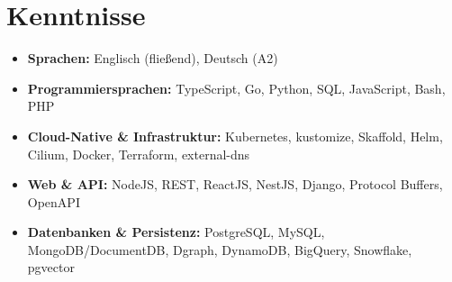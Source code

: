 \documentclass[11pt,a4paper]{resume}
\begin{document}
\section{Kenntnisse}

\begin{itemize}[leftmargin=1.4em,nosep,topsep=2pt]
  \item \textbf{Sprachen:} Englisch (fließend), Deutsch (A2)
  \item \textbf{Programmiersprachen:} TypeScript, Go, Python, SQL, JavaScript, Bash, PHP
  \item \textbf{Cloud-Native \& Infrastruktur:} Kubernetes, kustomize, Skaffold, Helm, Cilium, Docker, Terraform, external-dns
  \item \textbf{Web \& API:} NodeJS, REST, ReactJS, NestJS, Django, Protocol Buffers, OpenAPI
  \item \textbf{Datenbanken \& Persistenz:} PostgreSQL, MySQL, MongoDB/DocumentDB, Dgraph, DynamoDB, BigQuery, Snowflake, pgvector
\end{itemize}
\end{document}
